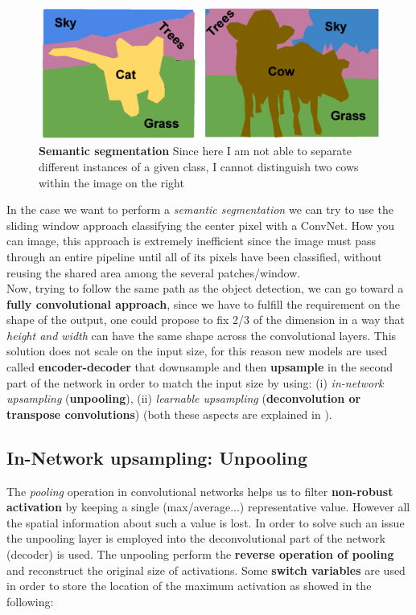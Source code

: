 \begin{figure}[h]
    \centering
    \includegraphics[scale=0.8]{img/Sem_Seg.png}
    \caption{\textbf{Semantic segmentation} Since here I am not able to separate different instances of a given class, I cannot distinguish two cows within the image on the right}
\end{figure}
In the case we want to perform a \textit{semantic segmentation} we can try to use the sliding window approach classifying the center pixel with a ConvNet. How you can image, this approach is extremely inefficient since the image must pass through an entire pipeline until all of its pixels have been classified, without reusing the shared area among the several patches/window. \\
Now, trying to follow the same path as the object detection, we can go toward a \textbf{fully convolutional approach}, since we have to fulfill the requirement on the shape of the output, one could propose to fix 2/3 of the dimension in a way that \emph{height and width} can have the same shape across the convolutional layers. This solution does not scale on the input size, for this reason new models are used called \textbf{encoder-decoder} that downsample and then \textbf{upsample} in the second part of the network in order to match the input size by using: (i) \textit{in-network upsampling} (\textbf{unpooling}), (ii) \textit{learnable upsampling} (\textbf{deconvolution or transpose convolutions}) (both these aspects are explained in \cite{noh2015learning}).

\subsection{In-Network upsampling: Unpooling}
The \textit{pooling} operation in convolutional networks helps us to filter \textbf{non-robust activation} by keeping a single (max/average...) representative value. However all the spatial information about such a value is lost. In order to solve such an issue the unpooling layer is employed into the deconvolutional part of the network (decoder) is used. The unpooling perform the \textbf{reverse operation of pooling} and reconstruct the original size of activations. Some \textbf{switch variables} are used in order to store the location of the maximum activation as showed in the following: 


